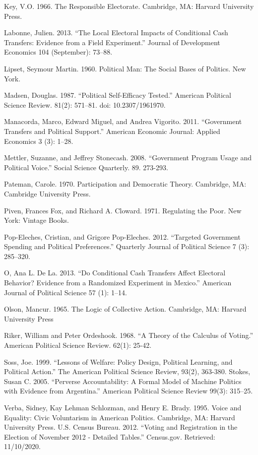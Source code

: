 \documentclass[12pt]{paper}
\begin{document}
\begin{hangparas}{.25in}{1}
Key, V.O. 1966. The Responsible Electorate. Cambridge, MA: Harvard University Press.


Labonne, Julien. 2013. “The Local Electoral Impacts of Conditional Cash Transfers: Evidence from a Field Experiment.” Journal of Development Economics 104 (September): 73–88.


Lipset, Seymour Martin. 1960. Political Man: The Social Bases of Politics. New York. 


Madsen, Douglas. 1987. “Political Self-Efficacy Tested.” American Political Science Review. 81(2): 571–81. doi: 10.2307/1961970.


Manacorda, Marco, Edward Miguel, and Andrea Vigorito. 2011. “Government Transfers and Political Support.” American Economic Journal: Applied Economics 3 (3): 1–28.


Mettler, Suzanne, and Jeffrey Stonecash. 2008. “Government Program Usage and Political Voice.” Social Science Quarterly. 89. 273-293. 


Pateman, Carole. 1970. Participation and Democratic Theory. Cambridge, MA: Cambridge University Press.


Piven, Frances Fox, and Richard A. Cloward. 1971. Regulating the Poor. New York: Vintage Books.


Pop-Eleches, Cristian, and Grigore Pop-Eleches. 2012. “Targeted Government Spending and Political Preferences.” Quarterly Journal of Political Science 7 (3): 285–320.


O, Ana L. De La. 2013. “Do Conditional Cash Transfers Affect Electoral Behavior? Evidence from a Randomized Experiment in Mexico.” American Journal of Political Science 57 (1): 1–14.


Olson, Mancur. 1965. The Logic of Collective Action. Cambridge, MA: Harvard University Press


Riker, William and Peter Ordeshook. 1968. “A Theory of the Calculus of Voting.” American Political Science Review. 62(1): 25-42.


Soss, Joe. 1999. “Lessons of Welfare: Policy Design, Political Learning, and Political Action.” The American Political Science Review, 93(2), 363-380.
Stokes, Susan C. 2005. “Perverse Accountability: A Formal Model of Machine Politics with Evidence from Argentina.” American Political Science Review 99(3): 315–25.


Verba, Sidney, Kay Lehman Schlozman, and Henry E. Brady. 1995. Voice and Equality: Civic Voluntarism in American Politics. Cambridge, MA: Harvard University Press.
U.S. Census Bureau. 2012. “Voting and Registration in the Election of November 2012 - Detailed Tables.” Census.gov. Retrieved: 11/10/2020.
\end{hangparas}
\clearpage
\end{document}

